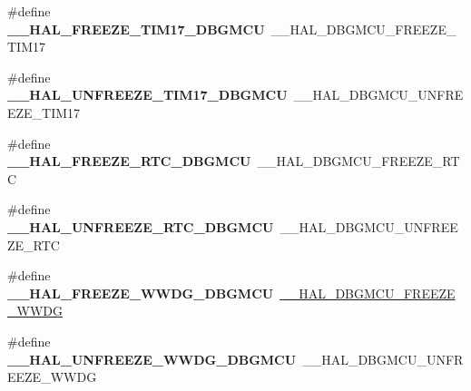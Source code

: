 \begin{DoxyCompactItemize}
\item 
\mbox{\label{group___h_a_l___d_b_g_m_c_u___aliased___macros_ga65b166b61431e09484788066a14f5ed9}} 
\#define {\bfseries \+\_\+\+\_\+\+H\+A\+L\+\_\+\+F\+R\+E\+E\+Z\+E\+\_\+\+T\+I\+M17\+\_\+\+D\+B\+G\+M\+CU}~\+\_\+\+\_\+\+H\+A\+L\+\_\+\+D\+B\+G\+M\+C\+U\+\_\+\+F\+R\+E\+E\+Z\+E\+\_\+\+T\+I\+M17
\item 
\mbox{\label{group___h_a_l___d_b_g_m_c_u___aliased___macros_ga8917b91d64c02daa61bfd4e80c920ea3}} 
\#define {\bfseries \+\_\+\+\_\+\+H\+A\+L\+\_\+\+U\+N\+F\+R\+E\+E\+Z\+E\+\_\+\+T\+I\+M17\+\_\+\+D\+B\+G\+M\+CU}~\+\_\+\+\_\+\+H\+A\+L\+\_\+\+D\+B\+G\+M\+C\+U\+\_\+\+U\+N\+F\+R\+E\+E\+Z\+E\+\_\+\+T\+I\+M17
\item 
\mbox{\label{group___h_a_l___d_b_g_m_c_u___aliased___macros_ga5cde9c9073ca8e95a084d62aac0931ef}} 
\#define {\bfseries \+\_\+\+\_\+\+H\+A\+L\+\_\+\+F\+R\+E\+E\+Z\+E\+\_\+\+R\+T\+C\+\_\+\+D\+B\+G\+M\+CU}~\+\_\+\+\_\+\+H\+A\+L\+\_\+\+D\+B\+G\+M\+C\+U\+\_\+\+F\+R\+E\+E\+Z\+E\+\_\+\+R\+TC
\item 
\mbox{\label{group___h_a_l___d_b_g_m_c_u___aliased___macros_ga95995ebdcbfbdc73e7d53d0d2ae2724e}} 
\#define {\bfseries \+\_\+\+\_\+\+H\+A\+L\+\_\+\+U\+N\+F\+R\+E\+E\+Z\+E\+\_\+\+R\+T\+C\+\_\+\+D\+B\+G\+M\+CU}~\+\_\+\+\_\+\+H\+A\+L\+\_\+\+D\+B\+G\+M\+C\+U\+\_\+\+U\+N\+F\+R\+E\+E\+Z\+E\+\_\+\+R\+TC
\item 
\mbox{\label{group___h_a_l___d_b_g_m_c_u___aliased___macros_ga731d1c183c8d3876895d80f0ba348616}} 
\#define {\bfseries \+\_\+\+\_\+\+H\+A\+L\+\_\+\+F\+R\+E\+E\+Z\+E\+\_\+\+W\+W\+D\+G\+\_\+\+D\+B\+G\+M\+CU}~\hyperlink{group___d_b_g_m_c_u___freeze___unfreeze_ga81215154725c479c67fb1adac906fbd9}{\+\_\+\+\_\+\+H\+A\+L\+\_\+\+D\+B\+G\+M\+C\+U\+\_\+\+F\+R\+E\+E\+Z\+E\+\_\+\+W\+W\+DG}
\item 
\mbox{\label{group___h_a_l___d_b_g_m_c_u___aliased___macros_gab0af7647542a9615339bd1b0b1fc4c27}} 
\#define {\bfseries \+\_\+\+\_\+\+H\+A\+L\+\_\+\+U\+N\+F\+R\+E\+E\+Z\+E\+\_\+\+W\+W\+D\+G\+\_\+\+D\+B\+G\+M\+CU}~\+\_\+\+\_\+\+H\+A\+L\+\_\+\+D\+B\+G\+M\+C\+U\+\_\+\+U\+N\+F\+R\+E\+E\+Z\+E\+\_\+\+W\+W\+DG

\end{DoxyCompactItemize}
